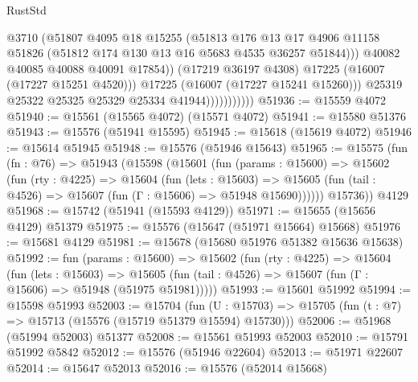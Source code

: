 \begin{lexlean}{RustStd}
\begin{coremodule}
                                  @3710
                                  (@51807
                                    @4095
                                    @18
                                    @15255
                                    (@51813
                                      @176
                                      @13
                                      @17
                                      @4906
                                      @11158
                                      @51826
                                      (@51812 @174 @130 @13 @16 @5683 @4535 @36257 @51844)))
                                  @40082
                                  @40085
                                  @40088
                                  @40091
                                  @17854))
                              (@17219 @36197 @4308)
                              @17225
                              (@16007 (@17227 @15251 @4520)))
                            @17225
                            (@16007 (@17227 @15241 @15260)))
                          @25319
                          @25322
                          @25325
                          @25329
                          @25334
                          @41944)))))))))))
@51936 := @15559 @4072
@51940 := @15561 (@15565 @4072) (@15571 @4072)
@51941 := @15580 @51376
@51943 := @15576 (@51941 @15595)
@51945 := @15618 (@15619 @4072)
@51946 := @15614 @51945
@51948 := @15576 (@51946 @15643)
@51965 := @15575
    (fun (fn : @76) =>
    @51943
      (@15598
        (@15601
          (fun (params : @15600) =>
          @15602
            (fun (rty : @4225) =>
            @15604
              (fun (lets : @15603) =>
              @15605 (fun (tail : @4526) => @15607 (fun (Γ : @15606) => @51948 @15690))))))
        @15736))
    @4129
@51968 := @15742 (@51941 (@15593 @4129))
@51971 := @15655 (@15656 @4129) @51379
@51975 := @15576 (@15647 (@51971 @15664) @15668)
@51976 := @15681 @4129
@51981 := @15678 (@15680 @51976 @51382 @15636 @15638)
@51992 := fun (params : @15600) =>
  @15602
    (fun (rty : @4225) =>
    @15604
      (fun (lets : @15603) =>
      @15605 (fun (tail : @4526) => @15607 (fun (Γ : @15606) => @51948 (@51975 @51981)))))
@51993 := @15601 @51992
@51994 := @15598 @51993
@52003 := @15704
    (fun (U : @15703) => @15705 (fun (t : @7) => @15713 (@15576 (@15719 @51379 @15594) @15730)))
@52006 := @51968 (@51994 @52003) @51377
@52008 := @15561 @51993 @52003
@52010 := @15791 @51992 @5842
@52012 := @15576 (@51946 @22604)
@52013 := @51971 @22607
@52014 := @15647 @52013
@52016 := @15576 (@52014 @15668)

\end{coremodule}
\end{lexlean}
